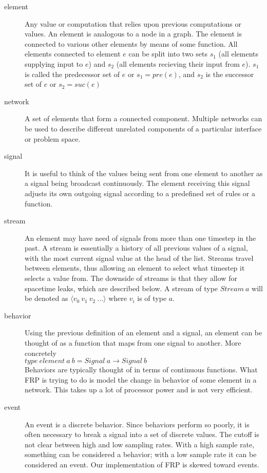 \documentclass[twocolumn,11pt,english]{article}
\begin{document}
\begin{description}
\item[element] Any value or computation that relies upon previous computations or values. An element is analogous to a node in a graph. The element is connected to various other elements by means of some function. All elements connected to element $e$ can be split into two sets $s_1$ (all elements supplying input to $e$) and $s_2$ (all elements recieving their input from $e$). $s_1$ is called the predecessor set of $e$ or $s_1 = pre(e)$, and $s_2$ is the successor set of $e$ or $s_2 = suc(e)$

\item[network] A set of elements that form a connected component. Multiple networks can be used to describe different unrelated components of a particular interface or problem space.

\item[signal] It is useful to think of the values being sent from one element to another as a signal being broadcast continuously. The element receiving this signal adjusts its own outgoing signal according to a predefined set of rules or a function.

\item[stream] An element may have need of signals from more than one timestep in the past. A stream is essentially a history of all previous values of a signal, with the most current signal value at the head of the list. Streams travel between elements, thus allowing an element to select what timestep it selects a value from. The downside of streams is that they allow for spacetime leaks, which are described below. A stream of type $Stream~a$ will be denoted as $\langle v_0~v_1~v_2~...\rangle$ where $v_i$ is of type $
a$.

\item[behavior] Using the previous definition of an element and a signal, an element can be thought of as a function that maps from one signal to another. More concretely \\
  $type~element~a~b = Signal ~a \rightarrow Signal ~b$\\
  Behaviors are typically thought of in terms of continuous functions. What FRP is trying to do is model the change in behavior of some element in a network. This takes up a lot of processor power  and is not very efficient.

\item[event] An event is a discrete behavior. Since behaviors perform so poorly, it is often necessary to break a signal into a set of discrete values. The cutoff is not clear between high and low sampling rates. With a high sample rate, something can be considered a behavior; with a low sample rate it can be considered an event. Our implementation of FRP is skewed toward events.


\end{description}
\end{document}
